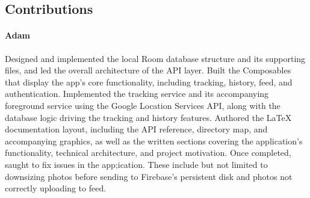 \documentclass{article}
\begin{document}
                \subsection{Contributions}

                    \paragraph{\textbf{Adam}} Designed and implemented the local Room database structure and its 
                        supporting files, and led the overall architecture of the API layer. Built the Composables 
                        that display the app's core functionality, including tracking, history, feed, and authentication. 
                        Implemented the tracking service and its accompanying foreground service using the Google 
                        Location Services API, along with the database logic driving the tracking and history 
                        features. Authored the LaTeX documentation layout, including the API reference, directory 
                        map, and accompanying graphics, as well as the written sections covering the application's 
                        functionality, technical architecture, and project motivation. Once completed, saught to 
                        fix issues in the app;ication. These include but not limited to downsizing photos before 
                        sending to Firebase's persistent disk and photos not correctly uploading to feed.

                \newpage
\end{document}
